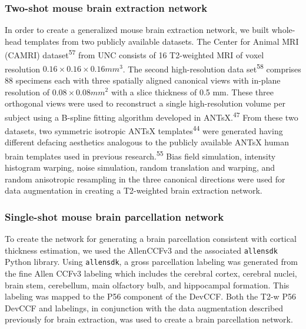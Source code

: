 \documentclass[
  12pt,
]{article}
\begin{document}
\hypertarget{two-shot-mouse-brain-extraction-network}{%
\subsubsection{Two-shot mouse brain extraction
network}\label{two-shot-mouse-brain-extraction-network}}

In order to create a generalized mouse brain extraction network, we
built whole-head templates from two publicly available datasets. The
Center for Animal MRI (CAMRI) dataset\textsuperscript{57} from UNC
consists of 16 T2-weighted MRI of voxel resolution
\(0.16 \times 0.16 \times 0.16 mm^3\). The second high-resolution data
set\textsuperscript{58} comprises 88 specimens each with three spatially
aligned canonical views with in-plane resolution of
\(0.08 \times 0.08 mm^2\) with a slice thickness of 0.5 mm. These three
orthogonal views were used to reconstruct a single high-resolution
volume per subject using a B-spline fitting algorithm developed in
ANTsX.\textsuperscript{47} From these two datasets, two symmetric
isotropic ANTsX templates\textsuperscript{44} were generated having
different defacing aesthetics analogous to the publicly available ANTsX
human brain templates used in previous research.\textsuperscript{55}
Bias field simulation, intensity histogram warping, noise simulation,
random translation and warping, and random anisotropic resampling in the
three canonical directions were used for data augmentation in creating a
T2-weighted brain extraction network.

\hypertarget{single-shot-mouse-brain-parcellation-network}{%
\subsubsection{Single-shot mouse brain parcellation
network}\label{single-shot-mouse-brain-parcellation-network}}

To create the network for generating a brain parcellation consistent
with cortical thickness estimation, we used the AllenCCFv3 and the
associated \texttt{allensdk} Python library. Using \texttt{allensdk}, a
gross parcellation labeling was generated from the fine Allen CCFv3
labeling which includes the cerebral cortex, cerebral nuclei, brain
stem, cerebellum, main olfactory bulb, and hippocampal formation. This
labeling was mapped to the P56 component of the DevCCF. Both the T2-w
P56 DevCCF and labelings, in conjunction with the data augmentation
described previously for brain extraction, was used to create a brain
parcellation network.
\end{document}
